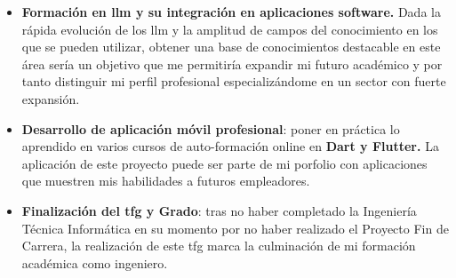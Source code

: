 \begin{itemize}
	\item \textbf{Formación en \acrshort{llm} y su integración en aplicaciones software.} Dada la rápida evolución de los \acrfull{llm} y la amplitud de campos del conocimiento en los que se pueden utilizar, obtener una base de conocimientos destacable en este área sería un objetivo que me permitiría expandir mi futuro académico y por tanto distinguir mi perfil profesional especializándome en un sector con fuerte expansión.
	\item \textbf{Desarrollo de aplicación móvil profesional}: poner en práctica lo aprendido en varios cursos de auto-formación online en \textbf{Dart y Flutter.} La aplicación de este proyecto puede ser parte de mi porfolio con aplicaciones que muestren mis habilidades a futuros empleadores.
	\item \textbf{Finalización del \acrshort{tfg} y Grado}: tras no haber completado la Ingeniería Técnica Informática en su momento por no haber realizado el Proyecto Fin de Carrera, la realización de este \acrshort{tfg} marca la culminación de mi formación académica como ingeniero.
\end{itemize}
